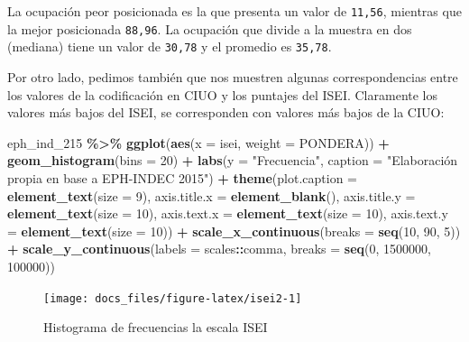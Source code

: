 \documentclass[
]{article}
\newenvironment{Shaded}{\begin{snugshade}}{\end{snugshade}}
\newcommand{\AttributeTok}[1]{\textcolor[rgb]{0.13,0.29,0.53}{#1}}
\newcommand{\DecValTok}[1]{\textcolor[rgb]{0.00,0.00,0.81}{#1}}
\newcommand{\FunctionTok}[1]{\textcolor[rgb]{0.13,0.29,0.53}{\textbf{#1}}}
\newcommand{\NormalTok}[1]{#1}
\newcommand{\SpecialCharTok}[1]{\textcolor[rgb]{0.81,0.36,0.00}{\textbf{#1}}}
\newcommand{\StringTok}[1]{\textcolor[rgb]{0.31,0.60,0.02}{#1}}
\begin{document}
La ocupación peor posicionada es la que presenta un valor de \texttt{11,56}, mientras que la mejor posicionada \texttt{88,96}. La ocupación que divide a la muestra en dos (mediana) tiene un valor de \texttt{30,78} y el promedio es \texttt{35,78}.

Por otro lado, pedimos también que nos muestren algunas correspondencias entre los valores de la codificación en CIUO y los puntajes del ISEI. Claramente los valores más bajos del ISEI, se corresponden con valores más bajos de la CIUO:

\begin{Shaded}
\begin{Highlighting}[]
\NormalTok{eph\_ind\_215 }\SpecialCharTok{\%\textgreater{}\%}
    \FunctionTok{ggplot}\NormalTok{(}\FunctionTok{aes}\NormalTok{(}\AttributeTok{x =}\NormalTok{ isei, }\AttributeTok{weight =}\NormalTok{ PONDERA)) }\SpecialCharTok{+} \FunctionTok{geom\_histogram}\NormalTok{(}\AttributeTok{bins =} \DecValTok{20}\NormalTok{) }\SpecialCharTok{+} \FunctionTok{labs}\NormalTok{(}\AttributeTok{y =} \StringTok{"Frecuencia"}\NormalTok{,}
    \AttributeTok{caption =} \StringTok{"Elaboración propia en base a EPH{-}INDEC 2015"}\NormalTok{) }\SpecialCharTok{+} \FunctionTok{theme}\NormalTok{(}\AttributeTok{plot.caption =} \FunctionTok{element\_text}\NormalTok{(}\AttributeTok{size =} \DecValTok{9}\NormalTok{),}
    \AttributeTok{axis.title.x =} \FunctionTok{element\_blank}\NormalTok{(), }\AttributeTok{axis.title.y =} \FunctionTok{element\_text}\NormalTok{(}\AttributeTok{size =} \DecValTok{10}\NormalTok{), }\AttributeTok{axis.text.x =} \FunctionTok{element\_text}\NormalTok{(}\AttributeTok{size =} \DecValTok{10}\NormalTok{),}
    \AttributeTok{axis.text.y =} \FunctionTok{element\_text}\NormalTok{(}\AttributeTok{size =} \DecValTok{10}\NormalTok{)) }\SpecialCharTok{+} \FunctionTok{scale\_x\_continuous}\NormalTok{(}\AttributeTok{breaks =} \FunctionTok{seq}\NormalTok{(}\DecValTok{10}\NormalTok{,}
    \DecValTok{90}\NormalTok{, }\DecValTok{5}\NormalTok{)) }\SpecialCharTok{+} \FunctionTok{scale\_y\_continuous}\NormalTok{(}\AttributeTok{labels =}\NormalTok{ scales}\SpecialCharTok{::}\NormalTok{comma, }\AttributeTok{breaks =} \FunctionTok{seq}\NormalTok{(}\DecValTok{0}\NormalTok{, }\DecValTok{1500000}\NormalTok{,}
    \DecValTok{100000}\NormalTok{))}
\end{Highlighting}
\end{Shaded}

\begin{figure}

{\centering \texttt{[image: docs\_files/figure-latex/isei2-1]} 

}

\caption{Histograma de frecuencias la escala ISEI}\label{fig:isei2}
\end{figure}
\end{document}
